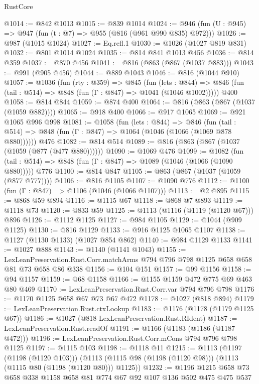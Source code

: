\begin{lexlean}{RustCore}
\begin{coremodule}
@1014 := @842 @1013
@1015 := @839 @1014
@1024 := @946 (fun (U : @945) => @947 (fun (t : @7) => @955 (@816 (@961 @990 @835) @972)))
@1026 := @987 (@1015 @1024)
@1027 := Eq.refl.{1}
@1030 := @1026 (@1027 @819 @831)
@1032 := @801 @1014 @1024
@1035 := @814 @841 @1013 @456
@1036 := @814 @359
@1037 := @870 @456
@1041 := @816 (@863 (@867 (@1037 @883)))
@1043 := @991 (@905 @456)
@1044 := @889 @1043
@1046 := @816 (@1044 @910)
@1057 := @1036
    (fun (rty : @359) =>
    @845
      (fun (lets : @844) =>
      @846 (fun (tail : @514) => @848 (fun (Γ : @847) => @1041 (@1046 @1002)))))
    @400
@1058 := @814 @844
@1059 := @874 @400
@1064 := @816 (@863 (@867 (@1037 (@1059 @882))))
@1065 := @918 @400
@1066 := @917 @1065
@1069 := @921 @1065 @996 @998
@1081 := @1058
    (fun (lets : @844) =>
    @846 (fun (tail : @514) => @848 (fun (Γ : @847) => @1064 (@1046 (@1066 (@1069 @878 @880))))))
    @476
@1082 := @814 @514
@1089 := @816 (@863 (@867 (@1037 (@1059 (@877 (@477 @880))))))
@1090 := @1069 @476
@1099 := @1082
    (fun (tail : @514) => @848 (fun (Γ : @847) => @1089 (@1046 (@1066 (@1090 @880)))))
    @776
@1100 := @814 @847
@1105 := @863 (@867 (@1037 (@1059 (@877 @777))))
@1106 := @816 @1105
@1107 := @1090 @776
@1112 := @1100 (fun (Γ : @847) => @1106 (@1046 (@1066 @1107)))
@1113 := @2 @895
@1115 := @868 @59 @894
@1116 := @1115 @67
@1118 := @868 @7 @893
@1119 := @1118 @73
@1120 := @833 @59
@1125 := @1113 (@1116 (@1119 (@1120 @67))) @896
@1126 := @1112 @1125
@1127 := @984 @1105
@1129 := @1044 (@909 @1125)
@1130 := @816 @1129
@1133 := @916 @1125 @1065 @1107
@1138 := @1127 (@1130 @1133) (@1027 @854 @862)
@1140 := @984 @1129 @1133
@1141 := @1027 @888
@1143 := @1140 (@1141 @1043)
@1155 := LexLeanPreservation.Rust.Corr.matchArms
    @794
    @796
    @798
    @1125
    @658
    @658
    @81
    @73
    @658
    @86
    @338
@1156 := @104 @151
@1157 := @99 @1156
@1158 := @94 @1157
@1159 := @68 @1158
@1166 := @1155 @1159 @472 @775 @69 @463 @80 @469
@1170 := LexLeanPreservation.Rust.Corr.var @794 @796 @798
@1176 := @1170 @1125 @658 @67 @73 @67 @472
@1178 := @1027 (@818 @894)
@1179 := LexLeanPreservation.Rust.ctxLookup
@1183 := @1176 (@1178 (@1179 @1125 @67))
@1186 := @1027 (@818 LexLeanPreservation.Rust.RIdent)
@1187 := LexLeanPreservation.Rust.readOf
@1191 := @1166 (@1183 (@1186 (@1187 @472)))
@1196 := LexLeanPreservation.Rust.Corr.mCons @794 @796 @798 @1125
@1197 := @1115 @103
@1198 := @1118 @11
@1215 := @1113
    (@1197 (@1198 (@1120 @103)))
    (@1113 (@1115 @98 (@1198 (@1120 @98))) (@1113 (@1115 @80 (@1198 (@1120 @80))) @1125))
@1232 := @1196 @1215 @658 @73 @658 @338 @1158 @658 @81 @774 @67 @92 @107 @136 @502 @475 @475 @537

\end{coremodule}
\end{lexlean}
